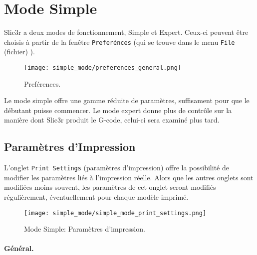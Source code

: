 \section{Mode Simple} %
\label{sec:simple_mode}

Slic3r a deux modes de fonctionnement, Simple et Expert. Ceux-ci peuvent \^etre choisis \`a partir de la fen\^etre \texttt{Prefer\'ences} (qui se trouve dans le menu  \texttt{File} (fichier) ).

\begin{figure}[ht]
\centering
\texttt{[image: simple\_mode/preferences\_general.png]}
\caption{Pref\'erences.}
\label{fig:preferences_general}
\end{figure}

Le mode simple offre une gamme r\'eduite de param\`etres, suffisament pour que le d\'ebutant puisse commencer. Le mode expert donne plus de contr\^ole sur la mani\`ere dont Slic3r produit le G-code, celui-ci sera examin\'e plus tard.

\subsection{Param\`etres d'Impression}

L'onglet \texttt{Print Settings} (param\`etres d'impression) 
offre la possibilit\'e de modifier les param\`etres li\'es \`a l'impression r\'eelle. Alors que les autres onglets sont modifi\'ees moins souvent, les param\`etres de cet onglet seront modifi\'es r\'eguli\`erement, \'eventuellement pour chaque mod\`ele imprim\'e.

\begin{figure}[ht]
\centering
\texttt{[image: simple\_mode/simple\_mode\_print\_settings.png]}
\caption{Mode Simple: Param\`etres d'impression.}
\label{fig:simple_mode_print_settings}
\end{figure}

\paragraph{G\'en\'eral.} %
\label{par:simple_general}

